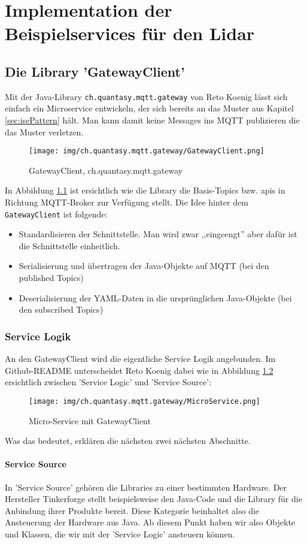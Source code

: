 \chapter{Implementation der Beispielservices für den Lidar}
\section{Die Library 'GatewayClient'}
Mit der  Java-Library \verb|ch.quantasy.mqtt.gateway| von Reto Koenig\cite{ch.quantasy.mqtt.gateway} lässt sich einfach ein Microservice entwickeln, der sich bereits an das Muster aus Kapitel \ref{sec:isePattern} hält. Man kann damit keine Messages ins MQTT publizieren die das Muster verletzen. 
\begin{figure}[H]
	\centering
	\texttt{[image: img/ch.quantasy.mqtt.gateway/GatewayClient.png]}
	\caption{GatewayClient, ch.quantasy.mqtt.gateway\cite{ch.quantasy.mqtt.gateway}}
	\label{fig:gatewayclient}
\end{figure}
In Abbildung \ref{fig:gatewayclient} ist ersichtlich wie die Library die Basis-Topics bzw. \acrshort{api}s in Richtung MQTT-Broker zur Verfügung stellt. Die Idee hinter dem \verb|GatewayClient| ist folgende:
\begin{itemize}
	\item
	Standardisieren der Schnittstelle. Man wird zwar ,,eingeengt'' aber dafür ist die Schnittstelle einheitlich.
	\item
	Serialisierung und übertragen der Java-Objekte auf MQTT (bei den published Topics)
	\item
	Deserialisierung der YAML-Daten in die ursprünglichen Java-Objekte (bei den subscribed Topics)
\end{itemize}
\subsection{Service Logik}
An den GatewayClient wird die eigentliche Service Logik angebunden. Im Github-README unterscheidet Reto Koenig\cite{ch.quantasy.mqtt.gateway} dabei wie in Abbildung \ref{fig:microService} ersichtlich zwischen 'Service Logic' und 'Service Source':
\begin{figure}[H]
	\centering
	\texttt{[image: img/ch.quantasy.mqtt.gateway/MicroService.png]}
	\caption{Micro-Service mit GatewayClient \cite{ch.quantasy.mqtt.gateway}}
	\label{fig:microService}
\end{figure}
Was das bedeutet, erklären die nächsten zwei nächsten Abschnitte.
\subsubsection{Service Source}
In 'Service Source' gehören die Libraries zu einer bestimmten Hardware. Der Hersteller Tinkerforge\cite{tinkerforge-gmbh} stellt beispielsweise den Java-Code und die Library für die Anbindung ihrer Produkte bereit. Diese Kategorie beinhaltet also die Ansteuerung der Hardware aus Java. Ab diesem Punkt haben wir also Objekte und Klassen, die wir mit der 'Service Logic' ansteuern können.
